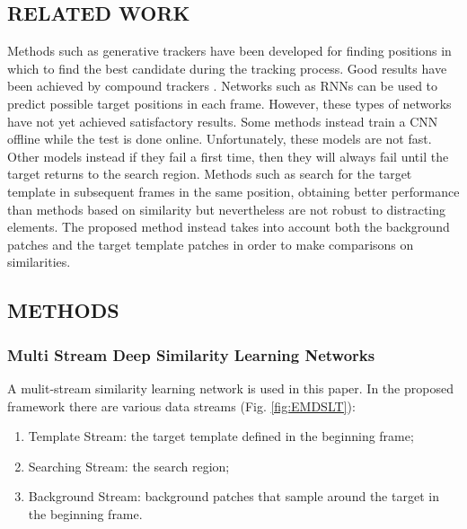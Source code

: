 \subsection{RELATED WORK}
Methods such as generative trackers have been developed for finding positions 
in which to find the best candidate during the tracking process. Good 
results have been achieved by compound trackers \cite{0893551105} \cite{0893551118}. Networks such as 
RNNs \cite{0893551121} can be used to predict possible target positions in each frame. 
However, these types of networks have not yet achieved satisfactory results. 
Some methods instead train a CNN offline while the test is done online. Unfortunately, 
these models are not fast. Other models instead if they fail a first 
time, then they will always fail until the target returns to the search region. 
Methods such as \cite{0893551129} \cite{0893551134} search for the target template in subsequent frames 
in the same position, obtaining better performance than methods based on 
similarity but nevertheless are not robust to distracting elements. The proposed 
method instead takes into account both the background patches and 
the target template patches in order to make comparisons on similarities.

\subsection{METHODS}
\subsubsection{Multi Stream Deep Similarity Learning Networks}
A mulit-stream similarity learning network is used in this paper. In the 
proposed framework there are various data streams (Fig. \ref{fig:EMDSLT}):
\begin{enumerate}
    \item Template Stream: the target template defined in the beginning frame;
    \item Searching Stream: the search region;
    \item Background Stream: background patches that sample around the target 
    in the beginning frame.
\end{enumerate}

